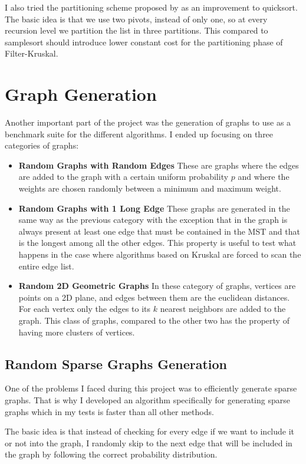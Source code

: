 \documentclass{article}
\begin{document}
I also tried the partitioning scheme proposed by \cite{dualpivot} as an improvement to quicksort. The basic idea is that we use two pivots, instead of only one, so at every recursion level we partition the list in three partitions. This compared to samplesort should introduce lower constant cost for the partitioning phase of Filter-Kruskal.

\section{Graph Generation}

Another important part of the project was the generation of graphs to use as a benchmark suite for the different algorithms. I ended up focusing on three categories of graphs:

\begin{itemize}
    \item \textbf{Random Graphs with Random Edges} These are graphs where the edges are added to the graph with a certain uniform probability $p$ and where the weights are chosen randomly between a minimum and maximum weight.
    \item \textbf{Random Graphs with 1 Long Edge} These graphs are generated in the same way as the previous category with the exception that in the graph is always present at least one edge that must be contained in the MST and that is the longest among all the other edges. This property is useful to test what happens in the case where algorithms based on Kruskal are forced to scan the entire edge list.
    \item \textbf{Random 2D Geometric Graphs} In these category of graphs, vertices are points on a 2D plane, and edges between them are the euclidean distances. For each vertex only the edges to its $k$ nearest neighbors are added to the graph. This class of graphs, compared to the other two has the property of having more clusters of vertices.
\end{itemize}

\subsection{Random Sparse Graphs Generation}

One of the problems I faced during this project was to efficiently generate sparse graphs. That is why I developed an algorithm specifically for generating sparse graphs which in my tests is faster than all other methods.

The basic idea is that instead of checking for every edge if we want to include it or not into the graph, I randomly skip to the next edge that will be included in the graph by following the correct probability distribution.
\end{document}
